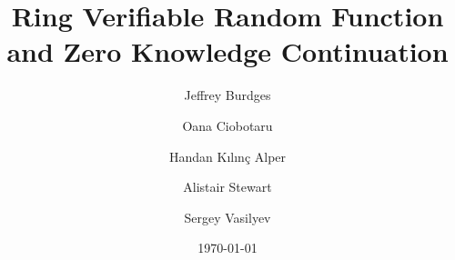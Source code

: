 \documentclass{llncs}
\title{Ring Verifiable Random Function and Zero Knowledge Continuation}
\author{Jeffrey Burdges \and Oana Ciobotaru \and Handan K{\i}l{\i}nç Alper \and Alistair Stewart \and Sergey Vasilyev}
\institute{Web 3.0 Foundation}
\date{\today}
\def\eprint#1#2{#2} %
\begin{document}
	
\maketitle

\begin{abstract}

\end{abstract}



% 



%  









\appendix


\eprint{}{}



\end{document}
